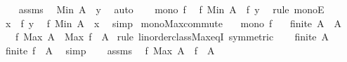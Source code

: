 \begin{isabellebody}
\isanewline
\ \ \isamarkupfalse%
\ assms\ \isamarkupfalse%
\ {\isachardoublequoteopen}Min\ A\ {\isasymle}\ y{\isachardoublequoteclose}\ \isamarkupfalse%
\ auto\isanewline
\ \ \isamarkupfalse%
\ {\isacartoucheopen}mono\ f{\isacartoucheclose}\ \isamarkupfalse%
\ {\isachardoublequoteopen}f\ {\isacharparenleft}{\kern0pt}Min\ A{\isacharparenright}{\kern0pt}\ {\isasymle}\ f\ y{\isachardoublequoteclose}\ \isamarkupfalse%
\ {\isacharparenleft}{\kern0pt}rule\ monoE{\isacharparenright}{\kern0pt}\isanewline
\ \ \isamarkupfalse%
\ {\isacartoucheopen}x\ {\isacharequal}{\kern0pt}\ f\ y{\isacartoucheclose}\ \isamarkupfalse%
\ {\isachardoublequoteopen}f\ {\isacharparenleft}{\kern0pt}Min\ A{\isacharparenright}{\kern0pt}\ {\isasymle}\ x{\isachardoublequoteclose}\ \isamarkupfalse%
\ simp\isanewline
{}\isamarkupfalse%
%
\endisatagproof
{\isafoldproof}%
%
\isadelimproof
\isanewline
%
\endisadelimproof
\isanewline
{}\isamarkupfalse%
\ mono{\isacharunderscore}{\kern0pt}Max{\isacharunderscore}{\kern0pt}commute{\isacharcolon}{\kern0pt}\isanewline
\ \ \ {\isachardoublequoteopen}mono\ f{\isachardoublequoteclose}\isanewline
\ \ \ {\isachardoublequoteopen}finite\ A{\isachardoublequoteclose}\ \ {\isachardoublequoteopen}A\ {\isasymnoteq}\ {\isacharbraceleft}{\kern0pt}{\isacharbraceright}{\kern0pt}{\isachardoublequoteclose}\isanewline
\ \ \ {\isachardoublequoteopen}f\ {\isacharparenleft}{\kern0pt}Max\ A{\isacharparenright}{\kern0pt}\ {\isacharequal}{\kern0pt}\ Max\ {\isacharparenleft}{\kern0pt}f\ {\isacharbackquote}{\kern0pt}\ A{\isacharparenright}{\kern0pt}{\isachardoublequoteclose}\isanewline
%
\isadelimproof
%
\endisadelimproof
%
\isatagproof
{}\isamarkupfalse%
\ {\isacharparenleft}{\kern0pt}rule\ linorder{\isacharunderscore}{\kern0pt}class{\isachardot}{\kern0pt}Max{\isacharunderscore}{\kern0pt}eqI\ {\isacharbrackleft}{\kern0pt}symmetric{\isacharbrackright}{\kern0pt}{\isacharparenright}{\kern0pt}\isanewline
\ \ \isamarkupfalse%
\ {\isacartoucheopen}finite\ A{\isacartoucheclose}\ \isamarkupfalse%
\ {\isachardoublequoteopen}finite\ {\isacharparenleft}{\kern0pt}f\ {\isacharbackquote}{\kern0pt}\ A{\isacharparenright}{\kern0pt}{\isachardoublequoteclose}\ \isamarkupfalse%
\ simp\isanewline
\ \ \isamarkupfalse%
\ assms\ \isamarkupfalse%
\ {\isachardoublequoteopen}f\ {\isacharparenleft}{\kern0pt}Max\ A{\isacharparenright}{\kern0pt}\ {\isasymin}\ f\ {\isacharbackquote}{\kern0pt}\ A{\isachardoublequoteclose}\ \isamarkupfalse%

\end{isabellebody}
